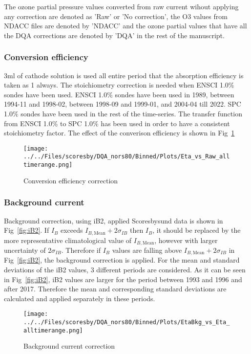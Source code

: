 The ozone partial pressure values converted from raw current
wihout applying any correction are denoted as 'Raw' or 'No correction', the O3 values from NDACC files are denoted
by 'NDACC' and the ozone partial values that have all the DQA corrections
are denoted by 'DQA' in the rest of the manuscript.


    \subsubsection{Conversion efficiency}
3ml of cathode solution is used all entire period that the absorption efficiency is taken as 1 always.
 The stoichiometry correction is needed when ENSCI 1.0\% sondes have been used.
ENSCI 1.0\% sondes have been used in 1989, between 1994-11 and 1998-02,
between 1998-09 and 1999-01, and 2004-04 till 2022. SPC 1.0\% sondes have been used in the rest of the time-series.
The transfer function from ENSCI 1.0\% to SPC 1.0\% has been used in order to have a consistent stoichiometry
factor. The effect of the converison efficiency is shown in Fig~\ref{fig:eta}


%
                \begin{figure}
        \centering
\texttt{[image: ../../Files/scoresby/DQA\_nors80/Binned/Plots/Eta\_vs\_Raw\_alltimerange.png]}
    \caption{Conversion efficiency correction}
            \label{fig:eta}
    \end{figure}

        \subsubsection{Background current}
        Background correction, using iB2, applied Scoresbysund data is shown in Fig~\ref{fig:iB2}. If $I_B$ exceeds $I_{B,\text{Mean}}+2\sigma_{IB}$ then $I_B$, it
should be replaced by the more representative climatological value of $I_{B,\text{Mean}}$, however with
larger uncertainty of $2\sigma_{IB}$.
Therefore if $I_B$ values are falling above $I_{B,\text{Mean}}+2\sigma_{IB}$ in Fig~\ref{fig:iB2}, the background correction is applied.
For the mean and standard deviations
of the iB2 values, 3 different periods are considered.
As it can be seen in Fig~\ref{fig:iB2}, iB2 values are larger for the period between 1993 and 1996 and after 2017.
Therefore the mean and corresponding standard deviations are calculated and applied separately in these periods.
%
                \begin{figure}
        \centering
\texttt{[image: ../../Files/scoresby/DQA\_nors80/Binned/Plots/EtaBkg\_vs\_Eta\_alltimerange.png]}
    \caption{Background current correction}
            \label{fig:bkg}
    \end{figure}
